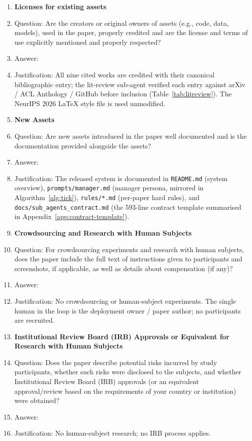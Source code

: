 \begin{enumerate}
\item {\bf Licenses for existing assets}
    \item[] Question: Are the creators or original owners of assets (e.g., code, data, models), used in the paper, properly credited and are the license and terms of use explicitly mentioned and properly respected?
    \item[] Answer: \answerYes{}
    \item[] Justification: All nine cited works are credited with their canonical bibliographic entry; the lit-review sub-agent verified each entry against arXiv / ACL Anthology / GitHub before inclusion (Table~\ref{tab:litreview}). The NeurIPS 2026 LaTeX style file is used unmodified.

\item {\bf New Assets}
    \item[] Question: Are new assets introduced in the paper well documented and is the documentation provided alongside the assets?
    \item[] Answer: \answerYes{}
    \item[] Justification: The released system is documented in \texttt{README.md} (system overview), \texttt{prompts/manager.md} (manager persona, mirrored in Algorithm~\ref{alg:tick}), \texttt{rules/*.md} (per-paper hard rules), and \texttt{docs/sub\_agents\_contract.md} (the 593-line contract template summarised in Appendix~\ref{app:contract-template}).

\item {\bf Crowdsourcing and Research with Human Subjects}
    \item[] Question: For crowdsourcing experiments and research with human subjects, does the paper include the full text of instructions given to participants and screenshots, if applicable, as well as details about compensation (if any)?
    \item[] Answer: \answerNA{}
    \item[] Justification: No crowdsourcing or human-subject experiments. The single human in the loop is the deployment owner / paper author; no participants are recruited.

\item {\bf Institutional Review Board (IRB) Approvals or Equivalent for Research with Human Subjects}
    \item[] Question: Does the paper describe potential risks incurred by study participants, whether such risks were disclosed to the subjects, and whether Institutional Review Board (IRB) approvals (or an equivalent approval/review based on the requirements of your country or institution) were obtained?
    \item[] Answer: \answerNA{}
    \item[] Justification: No human-subject research; no IRB process applies.


\end{enumerate}
